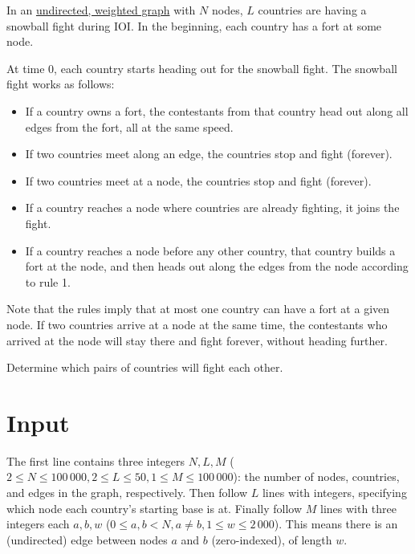 In an \href{https://en.wikipedia.org/wiki/Graph_(discrete_mathematics)}{undirected, weighted graph}
with $N$ nodes, $L$ countries are having a snowball fight during IOI.
In the beginning, each country has a fort at some node.

At time $0$, each country starts heading out for the snowball fight. The snowball fight works as follows:

\begin{itemize}
\item If a country owns a fort, the contestants from that country head out along all edges from the fort, all at the same speed.
\item If two countries meet along an edge, the countries stop and fight (forever).
\item If two countries meet at a node, the countries stop and fight (forever).
\item If a country reaches a node where countries are already fighting, it joins the fight.
\item If a country reaches a node before any other country, that country builds a fort at the node, and then heads out along the edges from the node according to rule 1.
\end{itemize}

Note that the rules imply that at most one country can have a fort at a given node.
If two countries arrive at a node at the same time, the contestants who arrived at the node will stay there and fight forever, without heading further.

Determine which pairs of countries will fight each other.

\section*{Input}

The first line contains three integers $N,L,M$ ($2 \le N \le 100\,000, 2 \le L \le 50, 1 \le M \le 100\,000$):
the number of nodes, countries, and edges in the graph, respectively.
Then follow $L$ lines with integers, specifying which node each country's starting base is at.
Finally follow $M$ lines with three integers each $a, b, w$ ($0 \le a,b < N, a \neq b, 1 \le w \le 2\,000$).
This means there is an (undirected) edge between nodes $a$ and $b$ (zero-indexed), of length $w$.

